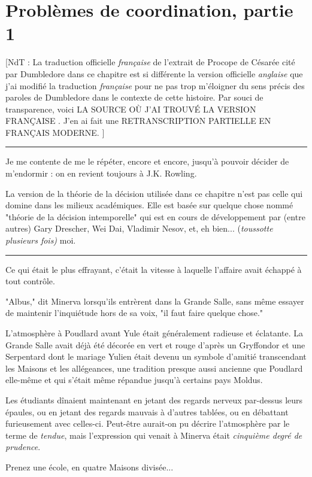 
\chapter{Problèmes de coordination, partie 1}

[NdT : La traduction officielle \emph{française}  de l'extrait de Procope de Césarée cité par Dumbledore dans ce chapitre est si différente la version officielle \emph{anglaise } que j'ai modifié la traduction \emph{française } pour ne pas trop m'éloigner du sens précis des paroles de Dumbledore dans le contexte de cette histoire. Par souci de transparence, voici \MakeUppercase{la source où j'ai trouvé la version française }. J'en ai fait une \MakeUppercase{retranscription partielle en français moderne}. ]
\par\noindent\rule{\textwidth}{0.4pt}
Je me contente de me le répéter, encore et encore, jusqu'à pouvoir décider de m'endormir : on en revient toujours à J.K. Rowling.

La version de la théorie de la décision utilisée dans ce chapitre n'est pas celle qui domine dans les milieux académiques. Elle est basée sur quelque chose nommé "théorie de la décision intemporelle" qui est en cours de développement par (entre autres) Gary Drescher, Wei Dai, Vladimir Nesov, et, eh bien... (\emph{toussotte plusieurs fois)}  moi.
\par\noindent\rule{\textwidth}{0.4pt}
Ce qui était le plus effrayant, c'était la vitesse à laquelle l'affaire avait échappé à tout contrôle.

"Albus," dit Minerva lorsqu'ils entrèrent dans la Grande Salle, sans même essayer de maintenir l'inquiétude hors de sa voix, "il faut faire quelque chose."

L'atmosphère à Poudlard avant Yule était généralement radieuse et éclatante. La Grande Salle avait déjà été décorée en vert et rouge d'après un Gryffondor et une Serpentard dont le mariage Yulien était devenu un symbole d'amitié transcendant les Maisons et les allégeances, une tradition presque aussi ancienne que Poudlard elle-même et qui s'était même répandue jusqu'à certains pays Moldus.

Les étudiants dînaient maintenant en jetant des regards nerveux par-dessus leurs épaules, ou en jetant des regards mauvais à d'autres tablées, ou en débattant furieusement avec celles-ci. Peut-être aurait-on pu décrire l'atmosphère par le terme de \emph{tendue}, mais l'expression qui venait à Minerva était \emph{cinquième degré de prudence}.

Prenez une école, en quatre Maisons divisée...

